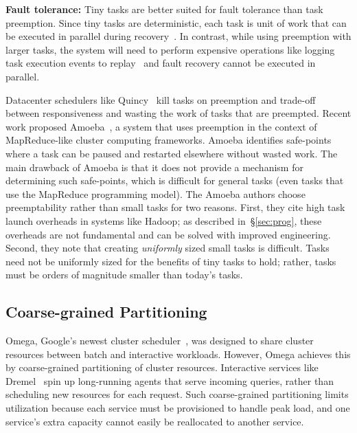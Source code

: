 

\vspace{4pt}\noindent\textbf{Fault tolerance:}
Tiny tasks are better suited for
fault tolerance than task preemption. Since tiny tasks
are deterministic, each task is unit of work that can be executed in parallel
 during recovery~\cite{zaharia2012discretized}.
In contrast, while using 
preemption with larger tasks, the system will need to perform expensive
operations like logging task execution events to replay~\cite{dunlap2002revirt}
and fault recovery cannot be executed in parallel.

Datacenter schedulers like Quincy~\cite{isard2009quincy} kill tasks on
preemption and trade-off between responsiveness and wasting the work of tasks
that are preempted.  Recent work proposed Amoeba~\cite{ananthanarayanan2012true},
a system that uses preemption in the context of MapReduce-like
cluster computing frameworks. Amoeba identifies safe-points where a task can be
paused and restarted elsewhere without wasted work. The main drawback of Amoeba
is that it does not provide a mechanism for determining such safe-points, which
is difficult for general tasks (even tasks that use the MapReduce programming
model).  The Amoeba authors choose preemptability rather than small tasks for
two reasons. First, they cite high task launch overheads in systems like
Hadoop; as described in~\S\ref{sec:prog}, these overheads are not fundamental
and can be solved with improved engineering. Second, they note that creating
\emph{uniformly} sized small tasks is difficult. Tasks need not be uniformly
sized for the benefits of tiny tasks to hold; rather, tasks must be orders of
magnitude smaller than today's tasks.

\subsection{Coarse-grained Partitioning}
Omega, Google's newest cluster scheduler~\cite{melnik2010dremel},
was designed to share cluster
resources between batch and interactive workloads. However, Omega achieves
this by coarse-grained partitioning of cluster resources.
Interactive services like Dremel~\cite{melnik2010dremel} spin up long-running
agents that serve incoming queries, rather than scheduling new resources for
each request.  Such coarse-grained partitioning limits utilization because each service
must be provisioned to handle peak load, and one service's extra capacity
cannot easily be reallocated to another service.

